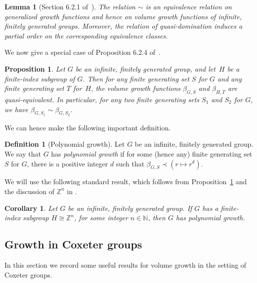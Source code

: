 \documentclass[11pt]{amsart}
\theoremstyle{plain}
\newtheorem{prop}[thm]{Proposition}
\newtheorem{lemma}[thm]{Lemma}
\newtheorem{corollary}[thm]{Corollary}
\theoremstyle{definition}
\newtheorem{definition}[thm]{Definition}
\newcommand{\Z}{\mathbb{Z}}
\newcommand{\N}{\mathbb{N}}
\numberwithin{equation}{subsection}
\begin{document}
\begin{lemma}[Section 6.2.1 of~\cite{Loeh}]\label{lem:growth} 
 The relation $\sim$ is an equivalence relation on generalized growth functions and hence on volume growth functions of infinite, finitely generated groups. Moreover, the relation of quasi-domination induces a partial order on the corresponding equivalence classes.
\end{lemma}



We now give a special case of Proposition 6.2.4 of~\cite{Loeh}.

\begin{prop}\label{prop:growthQI} Let $G$ be an infinite, finitely generated group, and let~$H$ be a finite-index subgroup of $G$. Then for any finite generating set $S$ for $G$ and any finite generating set $T$ for~$H$, the volume growth functions $\beta_{G,S}$ and $\beta_{H,T}$ are quasi-equivalent. In particular, for any two finite generating sets $S_1$ and $S_2$ for $G$, we have $\beta_{G,S_1} \sim \beta_{G,S_2}$.
\end{prop}

We can hence make the following important definition.


\begin{definition}[Polynomial growth] Let $G$ be an infinite, finitely generated group. We say that $G$ has \emph{polynomial growth} if for some (hence any) finite generating set $S$ for $G$, there is a positive integer $d$ such that $\beta_{G,S} \prec (r \mapsto r^d)$.
\end{definition}

We will use the following standard result, which follows from Proposition~\ref{prop:growthQI} and  the discussion of $\Z^n$ in \cite[Section 6.1]{Loeh}.

\begin{corollary}\label{cor:vZn} Let $G$ be an infinite, finitely generated group. If $G$ has a finite-index subgroup $H \cong \Z^n$, for some integer $n \in \N$, then $G$ has polynomial growth.
\end{corollary}



\subsection{Growth in Coxeter groups}\label{sec:growthCoxeter}

In this section we record some useful results for volume growth in the setting of Coxeter groups. 
\end{document}
